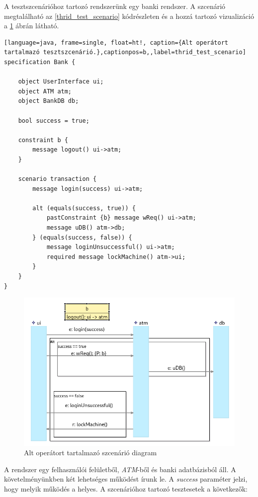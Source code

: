 A tesztszcenárióhoz tartozó rendszerünk egy banki rendszer.
A szcenárió megtalálható az \ref{thrid_test_scenario} kódrészleten és a hozzá tartozó vizualizáció a \ref{third_visualisation} ábrán látható.

\begin{lstlisting}[language=java, frame=single, float=ht!, caption={Alt operátort tartalmazó tesztszcenárió.},captionpos=b,,label=thrid_test_scenario]
specification Bank {

    object UserInterface ui;
    object ATM atm;
    object BankDB db;

    bool success = true;

    constraint b {
        message logout() ui->atm;
    }

    scenario transaction {
        message login(success) ui->atm;

        alt (equals(success, true)) {
            pastConstraint {b} message wReq() ui->atm;
            message uDB() atm->db;
        } (equals(success, false)) {
            message loginUnsuccessful() ui->atm;
            required message lockMachine() atm->ui;
        }
    }
}
\end{lstlisting}

\begin{figure}[!ht]
    \centering
    \includegraphics[width=120mm, keepaspectratio]{figures/diagramAltExample.png}
    \caption{Alt operátort tartalmazó szcenárió diagram}
    \label{third_visualisation}
\end{figure}

A rendszer egy felhasználói felületből, \textit{ATM}-ből és banki adatbázisból áll.
A követelményünkben két lehetséges működést írunk le.
A \textit{success} paraméter jelzi, hogy melyik működés a helyes.
A szcenárióhoz tartozó tesztesetek a következők:


